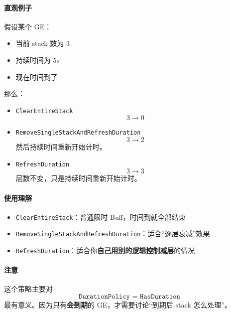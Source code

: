\documentclass[CJKmath=true,10pt]{MyBook}
\begin{document}
\paragraph{直观例子}
假设某个 GE：
\begin{itemize}
	\item 当前 stack 数为 $3$
	\item 持续时间为 $5s$
	\item 现在时间到了
\end{itemize}

那么：

\begin{itemize}
	\item \texttt{ClearEntireStack}
	\[
	3 \rightarrow 0
	\]
	
	\item \texttt{RemoveSingleStackAndRefreshDuration}
	\[
	3 \rightarrow 2
	\]
	然后持续时间重新开始计时。
	
	\item \texttt{RefreshDuration}
	\[
	3 \rightarrow 3
	\]
	层数不变，只是持续时间重新开始计时。
\end{itemize}

\paragraph{使用理解}
\begin{itemize}
	\item \texttt{ClearEntireStack}：普通限时 Buff，时间到就全部结束
	\item \texttt{RemoveSingleStackAndRefreshDuration}：适合“逐层衰减”效果
	\item \texttt{RefreshDuration}：适合你\textbf{自己用别的逻辑控制减层}的情况
\end{itemize}

\paragraph{注意}
这个策略主要对
\[
\texttt{DurationPolicy = HasDuration}
\]
最有意义。因为只有\textbf{会到期}的 GE，才需要讨论“到期后 stack 怎么处理”。
\end{document}
